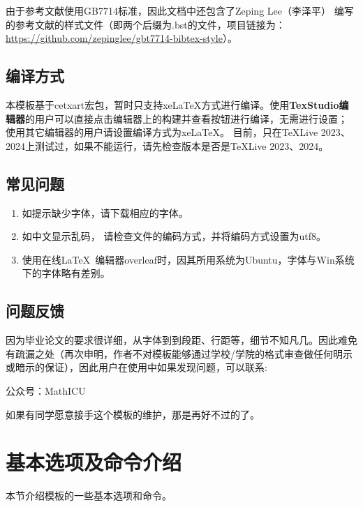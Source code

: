 由于参考文献使用GB7714标准，因此文档中还包含了Zeping Lee（李泽平） 编写的参考文献的样式文件（即两个后缀为.bst的文件，项目链接为：\url{https://github.com/zepinglee/gbt7714-bibtex-style}）。

\subsection{编译方式}
本模板基于cetxart宏包，暂时只支持xeLaTeX方式进行编译。使用{\bfseries TexStudio编辑器}的用户可以直接点击编辑器上的构建并查看按钮进行编译，无需进行设置； 使用其它编辑器的用户请设置编译方式为xeLaTeX。 {\color{red}目前，只在TeXLive 2023、2024上测试过，如果不能运行，请先检查版本是否是TeXLive 2023、2024。}

\subsection{常见问题}

\begin{enumerate}
    \item 如提示缺少字体，请下载相应的字体。
    \item 如中文显示乱码， 请检查文件的编码方式，并将编码方式设置为utf8。
    \item 使用在线\LaTeX~编辑器overleaf时，因其所用系统为Ubuntu，字体与Win系统下的字体略有差别。
\end{enumerate}

\subsection{问题反馈}
因为毕业论文的要求很详细，从字体到到段距、行距等，细节不知凡几。因此难免有疏漏之处{\color{red}（再次申明，作者不对模板能够通过学校/学院的格式审查做任何明示或暗示的保证）}，因此用户在使用中如果发现问题，可以联系:
\begin{center}
公众号：MathICU
\end{center}

{\large \color{red}如果有同学愿意接手这个模板的维护，那是再好不过的了。}



\section{基本选项及命令介绍}\label{sec:basic}
本节介绍模板的一些基本选项和命令。



